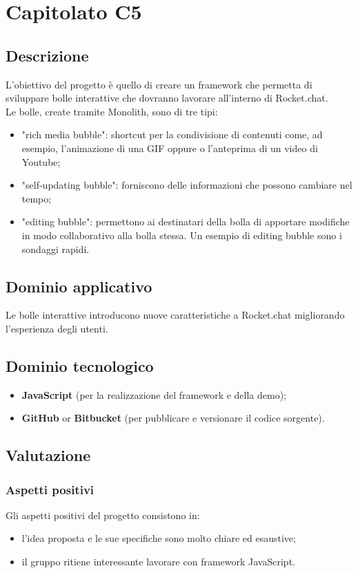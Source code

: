 \section {Capitolato C5}
	\subsection {Descrizione}
		L'obiettivo del progetto è quello di creare un framework che permetta di sviluppare bolle interattive che dovranno lavorare all'interno di Rocket.chat. \\
		Le bolle, create tramite Monolith, sono di tre tipi:
		\begin{itemize}
			\item "rich media bubble": shortcut per la condivisione di contenuti come, ad esempio, l'animazione di una GIF oppure o l'anteprima di un video di Youtube;
			\item "self-updating bubble": forniscono delle informazioni che possono cambiare nel tempo;
			\item "editing bubble": permettono ai destinatari della bolla di apportare modifiche in modo collaborativo alla bolla stessa. Un esempio di editing bubble sono i sondaggi rapidi.
		\end{itemize}
	\subsection {Dominio applicativo}
		Le bolle interattive introducono nuove caratteristiche a Rocket.chat migliorando l'esperienza degli utenti.
	\subsection {Dominio tecnologico}
		\begin{itemize}
		\item \textbf{JavaScript} (per la realizzazione del framework e della demo);
		\item \textbf{GitHub} or \textbf{Bitbucket} (per pubblicare e versionare il codice sorgente).
		\end{itemize}
	\subsection {Valutazione}
		\subsubsection {Aspetti positivi}
		Gli aspetti positivi del progetto consistono in:
			\begin{itemize}
				\item l’idea proposta e le sue specifiche sono molto chiare ed esaustive;
				\item il gruppo ritiene interessante lavorare con framework JavaScript.
			\end{itemize}
